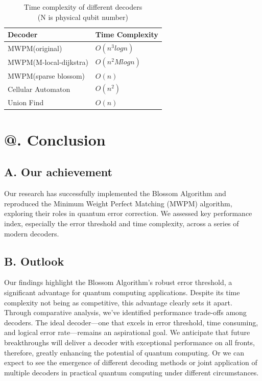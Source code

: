 \documentclass[
    a4paper, %
    10pt, %
    unnumberedsections, %
    twoside, %
]{LTJournalArticle}
\makeatletter
\newcommand{\Rmnum}[1]{\expandafter\@slowromancap\romannumeral #1@}
\makeatother
\begin{document}
\begin{table}[h]
    \caption{Time complexity of different decoders\\(N is physical qubit number)}
    \centering
    \begin{adjustbox}{max width=\columnwidth}
    \begin{tabular}{>{\raggedright\arraybackslash}p{} >{\raggedright\arraybackslash}p{}}
        \toprule
        Decoder & Time Complexity \\
        \midrule
        MWPM(original) & $O(n^3logn)$ \\
        MWPM(M-local-dijkstra) & $O(n^2Mlogn)$ \\
        MWPM(sparse blossom) & $O(n)$ \\
        Cellular Automaton & $O(n^2)$ \\
        Union Find & $O(n)$ \\
        \bottomrule
    \end{tabular}
    \end{adjustbox}
\end{table}
\section{\Rmnum{6}. Conclusion}
\subsection{A. Our achievement}
Our research has successfully implemented the Blossom Algorithm and reproduced the Minimum Weight Perfect Matching (MWPM) algorithm, exploring their roles in quantum error correction. We assessed key performance index, especially the error threshold and time complexity, across a series of modern decoders.
\subsection{B. Outlook}
Our findings highlight the Blossom Algorithm's robust error threshold, a significant advantage for quantum computing applications. Despite its time complexity not being as competitive, this advantage clearly sets it apart.
Through comparative analysis, we've identified performance trade-offs among decoders. The ideal decoder—one that excels in error threshold, time consuming, and logical error rate—remains an aspirational goal. We anticipate that future breakthroughs will deliver a decoder with exceptional performance on all fronts, therefore, greatly enhancing the potential of quantum computing. Or we can expect to see the emergence of different decoding methods or joint application of multiple decoders in practical quantum computing under different circumstances.


\end{document}
